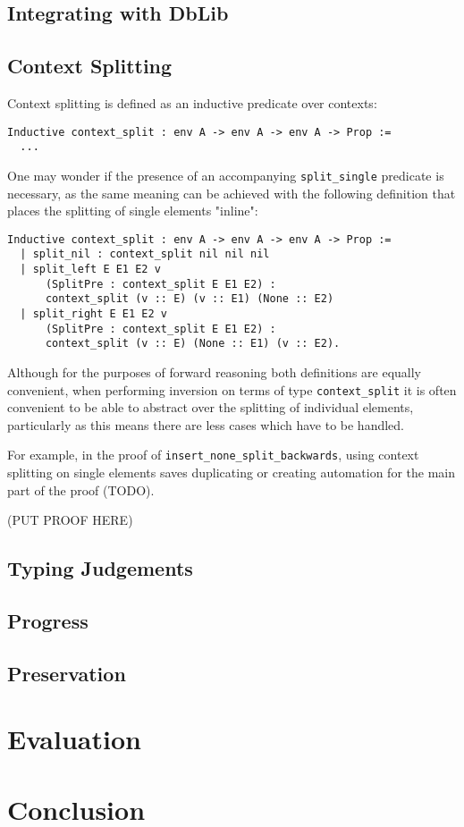 \documentclass[]{unswthesis}
\begin{document}
\section{Integrating with DbLib}

\section{Context Splitting}

Context splitting is defined as an inductive predicate over contexts:

\begin{verbatim}
Inductive context_split : env A -> env A -> env A -> Prop :=
  ...
\end{verbatim}

One may wonder if the presence of an accompanying \texttt{split\_single} predicate is necessary, as the same meaning can be achieved with the following definition that places the splitting of single elements "inline":

\begin{verbatim}
Inductive context_split : env A -> env A -> env A -> Prop :=
  | split_nil : context_split nil nil nil
  | split_left E E1 E2 v
  	  (SplitPre : context_split E E1 E2) :
  	  context_split (v :: E) (v :: E1) (None :: E2)
  | split_right E E1 E2 v
  	  (SplitPre : context_split E E1 E2) :
  	  context_split (v :: E) (None :: E1) (v :: E2).
\end{verbatim}

Although for the purposes of forward reasoning both definitions are equally convenient, when performing inversion on terms of type \texttt{context\_split} it is often convenient to be able to abstract over the splitting of individual elements, particularly as this means there are less cases which have to be handled.

For example, in the proof of \texttt{insert\_none\_split\_backwards}, using context splitting on single elements saves duplicating or creating automation for the main part of the proof (TODO).

(PUT PROOF HERE)

\section{Typing Judgements}

\section{Progress}

\section{Preservation}

\chapter{Evaluation}

\chapter{Conclusion}



\backmatter
\pagebreak


\end{document}
